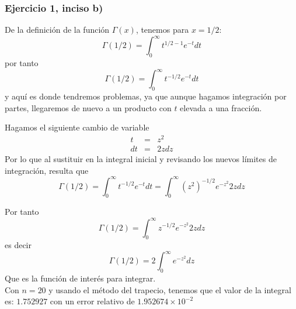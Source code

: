 \begin{frame}
\frametitle{Ejercicio 1, inciso b)}
De la definici\'{o}n de la funci\'{o}n $\Gamma (x)$, tenemos para $x=1/2$:
\[ \Gamma(1/2) = \int_{0}^{\infty} t^{1/2-1} e^{-t} dt\]
por tanto
\[ \Gamma(1/2) = \int_{0}^{\infty} t^{-1/2} e^{-t} dt\]
y aqu\'{i} es donde tendremos problemas, ya que aunque hagamos integraci\'{o}n por partes, llegaremos de nuevo a un producto con $t$ elevada a una fracci\'{o}n.
\end{frame}
\begin{frame}[fragile]
Hagamos el siguiente cambio de variable
\begin{eqnarray*}
	t &=& z^{2} \\
	dt &=& 2z dz
\end{eqnarray*}
Por lo que al sustituir en la integral inicial y revisando los nuevos l\'{i}mites de integraci\'{o}n, resulta que
\[  \Gamma(1/2) = \int_{0}^{\infty} t^{-1/2} e^{-t} dt = \int_{0}^{\infty} \left( z^{2} \right)^{-1/2} e^{-z^{2}} 2zdz \]
\end{frame}
\begin{frame}
Por tanto
\[ \Gamma(1/2) = \int_{0}^{\infty} z^{-1/2} e^{-z^{2}} 2z dz  \]
es decir
\[ \Gamma(1/2) = 2 \int_{0}^{\infty} e^{-z^{2}} dz  \]
Que es la funci\'{o}n de inter\'{e}s para integrar.
\\
\medskip
Con $n=20$ y usando el m\'{e}todo del trapecio, tenemos que el valor de la integral es: $1.752927$ con un error relativo de $1.952674 \times 10^{-2}$
\end{frame}
